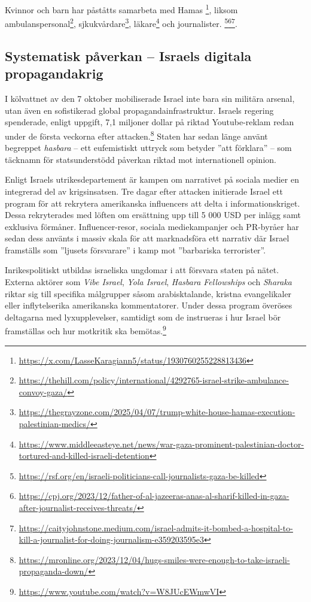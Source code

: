 Kvinnor och barn har påståtts samarbeta med Hamas \footnote{\url{https://x.com/LasseKaragiann5/status/1930760255228813436}}, liksom ambulanspersonal\footnote{\url{https://thehill.com/policy/international/4292765-israel-strike-ambulance-convoy-gaza/}}, sjkukvårdare\footnote{\url{https://thegrayzone.com/2025/04/07/trump-white-house-hamas-execution-palestinian-medics/}}, läkare\footnote{\url{https://www.middleeasteye.net/news/war-gaza-prominent-palestinian-doctor-tortured-and-killed-israeli-detention}} och journalister.
\footnote{\url{https://rsf.org/en/israeli-politicians-call-journalists-gaza-be-killed}}\footnote{\url{https://cpj.org/2023/12/father-of-al-jazeeras-anas-al-sharif-killed-in-gaza-after-journalist-receives-threats/}}\footnote{\url{https://caityjohnstone.medium.com/israel-admits-it-bombed-a-hospital-to-kill-a-journalist-for-doing-journalism-e359203595e3}}. 





\subsection{Systematisk påverkan – Israels digitala propagandakrig}

I kölvattnet av den 7 oktober mobiliserade Israel inte bara sin militära arsenal, utan även en sofistikerad global propagandainfrastruktur. Israels regering spenderade, enligt uppgift, 7,1 miljoner dollar på riktad Youtube-reklam redan under de första veckorna efter attacken.\footnote{\url{https://mronline.org/2023/12/04/hugs-smiles-were-enough-to-take-israeli-propaganda-down/}} Staten har sedan länge använt begreppet \textit{hasbara} – ett eufemistiskt uttryck som betyder ”att förklara” – som täcknamn för statsunderstödd påverkan riktad mot internationell opinion.

Enligt Israels utrikesdepartement är kampen om narrativet på sociala medier en integrerad del av krigsinsatsen. Tre dagar efter attacken initierade Israel ett program för att rekrytera amerikanska influencers att delta i informationskriget. Dessa rekryterades med löften om ersättning upp till 5 000 USD per inlägg samt exklusiva förmåner. Influencer-resor, sociala mediekampanjer och PR-byråer har sedan dess använts i massiv skala för att marknadsföra ett narrativ där Israel framställs som ”ljusets försvarare” i kamp mot ”barbariska terrorister”.

Inrikespolitiskt utbildas israeliska ungdomar i att försvara staten på nätet. Externa aktörer som \textit{Vibe Israel}, \textit{Yola Israel}, \textit{Hasbara Fellowships} och \textit{Sharaka} riktar sig till specifika målgrupper såsom arabisktalande, kristna evangelikaler eller inflytelserika amerikanska kommentatorer. Under dessa program överöses deltagarna med lyxupplevelser, samtidigt som de instrueras i hur Israel bör framställas och hur motkritik ska bemötas.\footnote{\url{https://www.youtube.com/watch?v=W8JUcEWmwVI}}

